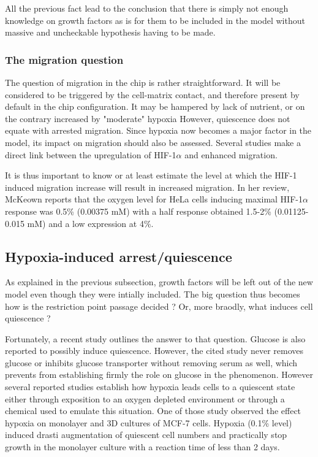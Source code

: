 \documentclass[11pt,a4paper]{article}
\begin{document}
All the previous fact lead to the conclusion that there is simply not enough knowledge on growth factors as is for them to be included in the model without massive and uncheckable hypothesis having to be made.

\subsubsection{The migration question}
The question of migration in the chip is rather straightforward. It will be considered to be triggered by the cell-matrix contact, and therefore present by default in the chip configuration. It may be hampered by lack of nutrient, or on the contrary increased by "moderate" hypoxia However, quiescence does not equate with arrested migration. Since hypoxia now becomes a major factor in the model, its impact on migration should also be assessed. Several studies make a direct link between the upregulation of HIF-1$\alpha$ and enhanced migration.\cite{Joseph2015}\cite{Velasquez2019}\cite{Eckerich2007} 

It is thus important to know or at least estimate the level at which the HIF-1 induced migration increase will result in increased migration. In her review, McKeown reports that the oxygen level for HeLa cells inducing maximal HIF-1$\alpha$ response was 0.5\% (0.00375 mM) with a half response obtained 1.5-2\% (0.01125-0.015 mM) and a low expression at 4\%.\cite{McKeown2014}

\subsection{Hypoxia-induced arrest/quiescence}
As explained in the previous subsection, growth factors will be left out of the new model even though they were intially included. The big question thus becomes how is the restriction point passage decided ? Or, more braodly, what induces cell quiescence ?

Fortunately, a recent study outlines the answer to that question.\cite{Nabil2021} Glucose is also reported to possibly induce quiescence. However, the cited study never removes glucose or inhibits glucose transporter without removing serum as well, which prevents from establishing firmly the role on glucose in the phenomenon.\cite{Hu2011}
However several reported studies establish how hypoxia leads cells to a quiescent state either through exposition to an oxygen depleted environment or through a chemical used to emulate this situation.\cite{Nabil2021} One of those study observed the effect hypoxia on monolayer and 3D cultures of MCF-7 cells. Hypoxia (0.1\% level) induced drasti augmentation of quiescent cell numbers and practically stop growth in the monolayer culture with a reaction time of less than 2 days.\cite{Lee2018}
\end{document}
